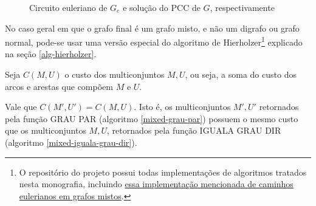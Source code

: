 \begin{figure}[H]
\begin{minipage}{.5\textwidth}
        \end{minipage}
        \caption{Circuito euleriano de $G_e$ e solução do PCC de $G$, respectivamente}
        \label{fig:mixed-ex-sol}
    \end{figure}

    No caso geral em que o grafo final é um grafo misto, e não um digrafo ou grafo normal, pode-se usar uma versão especial do algoritmo de Hierholzer\footnote{O repositório do projeto possui todas implementações de algoritmos tratados nesta monografia, incluindo \href{https://github.com/gafeol/chinese-postman/blob/master/code/euler-misto.cpp}{essa implementação mencionada de caminhos eulerianos em grafos mistos}.} explicado na seção \ref{alg-hierholzer}. 

    \begin{lemma}
        \label{mixed-custo-igual}
        Seja $C(M,U)$ o custo dos multiconjuntos $M,U$, ou seja, a soma do custo dos arcos e arestas que compõem $M$ e $U$.

        Vale que $C(M', U') = C(M, U)$. 
        Isto é, os multiconjuntos $M', U'$ retornados pela função GRAU PAR (algoritmo \ref{mixed-grau-par}) possuem o mesmo custo que os multiconjuntos $M, U$, retornados pela função IGUALA GRAU DIR (algoritmo \ref{mixed-iguala-grau-dir}).
    \end{lemma}

